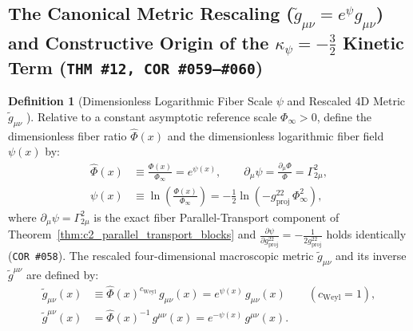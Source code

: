 \documentclass[11pt,a4paper]{article}
\newcommand{\catD}{\text{\textbf{\textcolor{blue!75!black}{[D]}}}}
\theoremstyle{definition}
\newtheorem{definition}[axiom]{Definition}
\theoremstyle{plain}
\theoremstyle{remark}
\begin{document}
\subsection{\texorpdfstring{The Canonical Metric Rescaling ($\tilde{g}_{\mu\nu} = e^{\psi}g_{\mu\nu}$) and Constructive Origin of the $\kappa_\psi = -\frac{3}{2}$ Kinetic Term (\texttt{THM~\#12, COR~\#059--\#060})}{The Canonical Metric Rescaling and Constructive Origin of the -(3/2)(nabla psi)\^2 Kinetic Term}}

\begin{definition}[Dimensionless Logarithmic Fiber Scale $\psi$ and Rescaled 4D Metric $\tilde{g}_{\mu\nu}$ \catD]\label{def:c3_rescaled_metric}
Relative to a constant asymptotic reference scale $\Phi_\infty > 0$, define the dimensionless fiber ratio $\hat{\Phi}(x)$ and the dimensionless logarithmic fiber field $\psi(x)$ by:
\begin{align}
\hat{\Phi}(x) &\equiv \frac{\Phi(x)}{\Phi_\infty} = e^{\psi(x)}, \qquad
\partial_\mu\psi = \frac{\partial_\mu\Phi}{\Phi} = \Gamma^2_{2\mu}, \nonumber \\[3pt]
\psi(x) &\equiv \ln\!\left(\frac{\Phi(x)}{\Phi_\infty}\right) = -\frac{1}{2}\ln\!\left(-g^{22}_{\mathrm{proj}}\,\Phi_\infty^2\right), \label{eq:c3_psi_def}
\end{align}
where $\partial_\mu\psi = \Gamma^2_{2\mu}$ is the exact fiber Parallel-Transport component of Theorem~\ref{thm:c2_parallel_transport_blocks} and $\frac{\partial\psi}{\partial g^{22}_{\mathrm{proj}}} = -\frac{1}{2g^{22}_{\mathrm{proj}}}$ holds identically (\texttt{COR~\#058}). The rescaled four-dimensional macroscopic metric $\tilde{g}_{\mu\nu}$ and its inverse $\tilde{g}^{\mu\nu}$ are defined by:
\begin{align}
\tilde{g}_{\mu\nu}(x) &\equiv \hat{\Phi}(x)^{c_{\mathrm{Weyl}}}\,g_{\mu\nu}(x) = e^{\psi(x)}\,g_{\mu\nu}(x) \qquad \left(c_{\mathrm{Weyl}} = 1\right), \nonumber \\[3pt]
\tilde{g}^{\mu\nu}(x) &= \hat{\Phi}(x)^{-1}\,g^{\mu\nu}(x) = e^{-\psi(x)}\,g^{\mu\nu}(x). \label{eq:c3_gtilde_def}
\end{align}
\end{definition}
\end{document}
